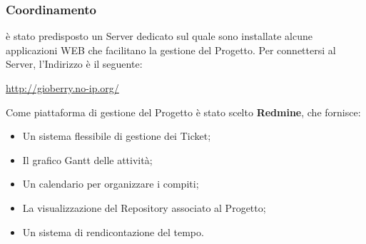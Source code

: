 \subsubsection{Coordinamento}
\label{sec:strumentiCoordinamento}
è stato predisposto un Server dedicato sul quale sono installate alcune applicazioni WEB
che facilitano la gestione del Progetto. Per connettersi al Server, l'Indirizzo è il seguente:\\
\begin{center}
\url{http://gioberry.no-ip.org/}
\end{center}
\label{subsec:Software di gestione del prodotto}
Come piattaforma di gestione del Progetto è stato scelto \textbf{Redmine}, che fornisce:
\begin{itemize}
\item Un sistema flessibile di gestione dei Ticket;
\item Il grafico Gantt delle attività;
\item Un calendario per organizzare i compiti;
\item La visualizzazione del Repository associato al Progetto;
\item Un sistema di rendicontazione del tempo.
\end{itemize}




